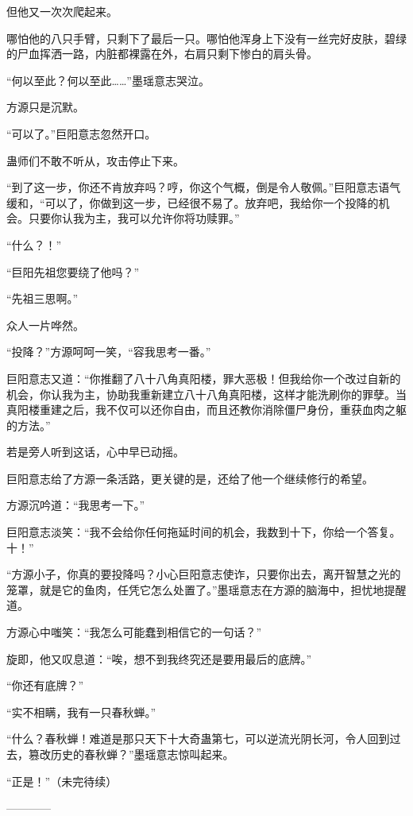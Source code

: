 \begin{this_body}
但他又一次次爬起来。

哪怕他的八只手臂，只剩下了最后一只。哪怕他浑身上下没有一丝完好皮肤，碧绿的尸血挥洒一路，内脏都裸露在外，右肩只剩下惨白的肩头骨。

“何以至此？何以至此……”墨瑶意志哭泣。

方源只是沉默。

“可以了。”巨阳意志忽然开口。

蛊师们不敢不听从，攻击停止下来。

“到了这一步，你还不肯放弃吗？哼，你这个气概，倒是令人敬佩。”巨阳意志语气缓和，“可以了，你做到这一步，已经很不易了。放弃吧，我给你一个投降的机会。只要你认我为主，我可以允许你将功赎罪。”

“什么？！”

“巨阳先祖您要绕了他吗？”

“先祖三思啊。”

众人一片哗然。

“投降？”方源呵呵一笑，“容我思考一番。”

巨阳意志又道：“你推翻了八十八角真阳楼，罪大恶极！但我给你一个改过自新的机会，你认我为主，协助我重新建立八十八角真阳楼，这样才能洗刷你的罪孽。当真阳楼重建之后，我不仅可以还你自由，而且还教你消除僵尸身份，重获血肉之躯的方法。”

若是旁人听到这话，心中早已动摇。

巨阳意志给了方源一条活路，更关键的是，还给了他一个继续修行的希望。

方源沉吟道：“我思考一下。”

巨阳意志淡笑：“我不会给你任何拖延时间的机会，我数到十下，你给一个答复。十！”

“方源小子，你真的要投降吗？小心巨阳意志使诈，只要你出去，离开智慧之光的笼罩，就是它的鱼肉，任凭它怎么处置了。”墨瑶意志在方源的脑海中，担忧地提醒道。

方源心中嗤笑：“我怎么可能蠢到相信它的一句话？”

旋即，他又叹息道：“唉，想不到我终究还是要用最后的底牌。”

“你还有底牌？”

“实不相瞒，我有一只春秋蝉。”

“什么？春秋蝉！难道是那只天下十大奇蛊第七，可以逆流光阴长河，令人回到过去，篡改历史的春秋蝉？”墨瑶意志惊叫起来。

“正是！”（未完待续）

------------

\end{this_body}

